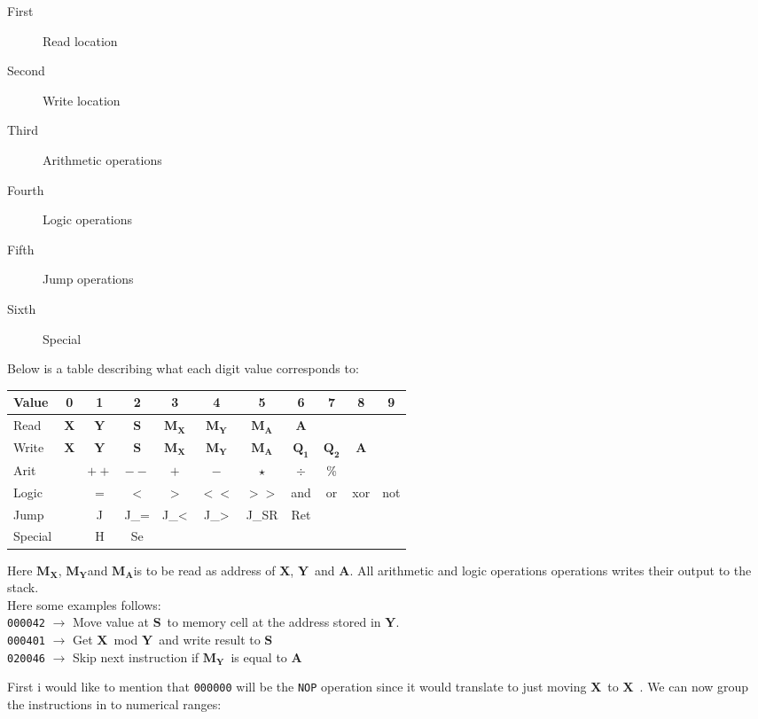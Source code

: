 \documentclass{article}
\newcommand{\x}{$\textbf{X}$}
\newcommand{\y}{$\textbf{Y}$}
\newcommand{\s}{$\textbf{S}$}
\newcommand{\A}{$\textbf{A}$}
\newcommand{\mx}{$\textbf{M}_{\textbf{X}}$}
\newcommand{\my}{$\textbf{M}_{\textbf{Y}}$}
\newcommand{\ma}{$\textbf{M}_{\textbf{A}}$}
\newcommand{\q}{$\textbf{Q}_{\textbf{1}}$}
\newcommand{\qq}{$\textbf{Q}_{\textbf{2}}$}
\begin{document}
\begin{description}
  \item[First] Read location
  \item[Second] Write location
  \item[Third] Arithmetic operations
  \item[Fourth] Logic operations
  \item[Fifth] Jump operations
  \item[Sixth] Special
\end{description}
Below is a table describing what each digit value corresponds to:
\begin{center}
\begin{tabular}{l || *{10}{c |}}
Value & 0 & 1 & 2 & 3 & 4 & 5 & 6 & 7 & 8 & 9 \\
\hline
Read & \x & \y & \s  &\mx & \my & \ma & \A & & & \\

Write & \x & \y & \s  &\mx & \my & \ma & \q& \qq & \A &\\

Arit &  & $++$ & $--$ & $+$ & $-$ & $\star$ & $\div$ & \%  &  & \\

Logic &  &  $=$ & $<$ & $>$ & $<<$ & $>>$ & and & or & xor & not\\

Jump & & J & J_{=} & J_{<} & J_{>} & J_{SR} & Ret & & & \\

Special & & H & Se &  &  &  &  &  &  &  \\	
\end{tabular}
\end{center}
Here \mx , \my and \ma is to be read as address of \x , \y \ and \A.  All
arithmetic and logic operations operations writes their output to the stack.\\
Here some examples follows:\\
\verb+000042+ $\rightarrow$ Move value at \s \ to memory cell at the address
stored in \y. \\
\verb+000401+ $\rightarrow$ Get \x \ mod \y \ and write result to \s \\
\verb+020046+ $\rightarrow$ Skip next instruction if \my \ is equal to \A \\
\newpage

First i would like to  mention that
\verb+000000+ will be the \verb+NOP+ operation since it would translate to just
moving \x \ to \x \ . 
We can now group the instructions in to numerical ranges:
\end{document}
